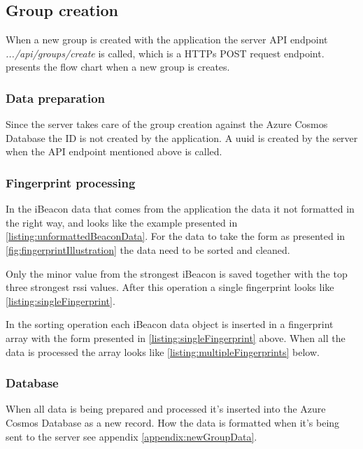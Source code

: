 \subsection{Group creation}\label{sec:implServerGroupCreation}
When a new group is created with the application the server API endpoint \textit{.../api/groups/create} is called, which is a HTTPs POST request \cite{POSTHTTPMDN} endpoint.
 presents the flow chart when a new group is creates.


\subsubsection{Data preparation}\label{sec:implServerGroupCreationDataPrep}
Since the server takes care of the group creation against the Azure Cosmos Database \cite{IntroductionAzureCosmos} the ID is not created by the application.
A \acrfull{uuid} \cite{CommonsIdUUID} is created by the server when the API endpoint mentioned above is called.

\subsubsection{Fingerprint processing}\label{sec:implServerGroupCreationFingerprint}

In the iBeacon data that comes from the application the data it not formatted in the right way, and looks like the example presented in \cref{listing:unformattedBeaconData}.
For the data to take the form as presented in \cref{fig:fingerprintIllustration} the data need to be sorted and cleaned.


Only the minor value from the strongest iBeacon is saved together with the top three strongest \acrshort{rssi} values. After this operation a single fingerprint looks like \cref{listing:singleFingerprint}.


In the sorting operation each iBeacon data object is inserted in a fingerprint array with the form presented in \cref{listing:singleFingerprint} above.
When all the data is processed the array looks like \cref{listing:multipleFingerprints} below.



\subsubsection{Database}\label{sec:implServerGroupCreationDatabase}
When all data is being prepared and processed it's inserted into the Azure Cosmos Database as a new record.
How the data is formatted when it's being sent to the server see appendix \ref{appendix:newGroupData}.

